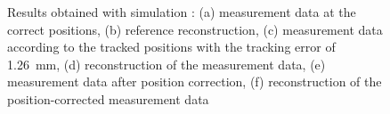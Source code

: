 \begin{figure}
\setlength{\abovecaptionskip}{-5pt} %
\setlength{\belowcaptionskip}{-5pt} %

\caption{Results obtained with simulation : (a) measurement data at the correct positions, (b) reference reconstruction, (c) measurement data according to the tracked positions with the tracking error of \SI{1.26}{\milli \metre}, (d) reconstruction of the measurement data, (e) measurement data after position correction, (f) reconstruction of the  position-corrected measurement data}
\label{fig:results_reco} 
\end{figure}